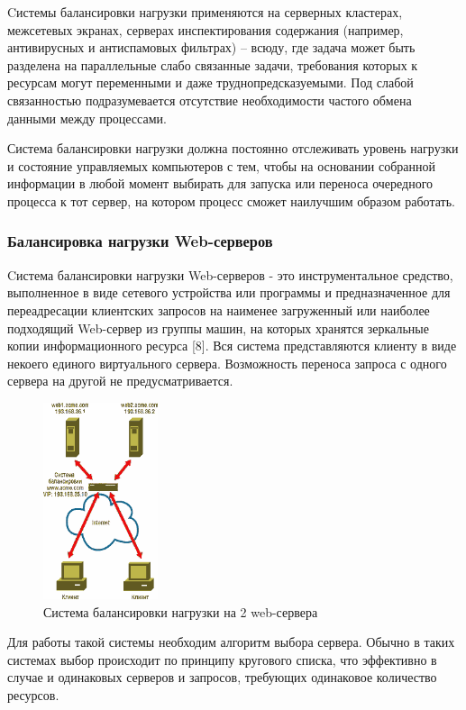 Cистемы балансировки нагрузки применяются на серверных кластерах, межсетевых экранах, серверах инспектирования содержания (например, антивирусных и антиспамовых фильтрах) – всюду, где задача может быть разделена на параллельные слабо связанные задачи, требования которых к ресурсам могут переменными и даже труднопредсказуемыми. Под слабой связанностью подразумевается отсутствие необходимости частого обмена данными между процессами.

Система балансировки нагрузки должна постоянно отслеживать уровень нагрузки и состояние управляемых компьютеров с тем, чтобы на основании собранной информации в любой момент выбирать для  запуска или переноса очередного процесса  к тот сервер, на котором процесс сможет наилучшим образом работать.

\subsubsection{Балансировка нагрузки Web-серверов}

Cистема балансировки нагрузки Web-серверов - это инструментальное средство, выполненное в виде сетевого  устройства или программы и предназначенное для переадресации клиентских запросов на наименее загруженный или наиболее подходящий Web-сервер из группы машин, на которых хранятся зеркальные копии информационного ресурса [8]. Вся система представляются клиенту в виде некоего единого виртуального сервера. Возможность переноса запроса с одного сервера на другой не предусматривается.

\begin{figure}
  \centering
  \includegraphics[width=0.3\textwidth]{images/balance-sys.png}
  \caption{Система балансировки нагрузки на 2 web-сервера}
\end{figure}

Для работы такой системы необходим алгоритм выбора сервера. Обычно в таких системах выбор происходит по принципу кругового списка, что эффективно в случае и одинаковых серверов и запросов, требующих одинаковое количество ресурсов.

